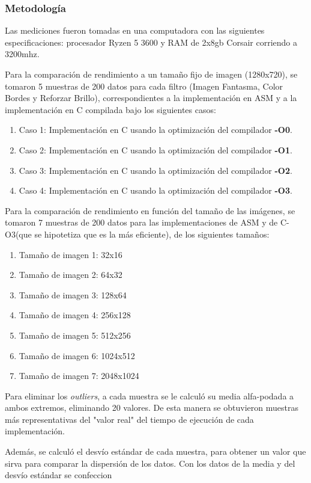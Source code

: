 \documentclass[a4paper]{article}
\begin{document}
\subsubsection{Metodología}
\justify
Las mediciones fueron tomadas en una computadora con las siguientes especificaciones: procesador Ryzen 5 3600 y RAM de 2x8gb Corsair corriendo a 3200mhz.

\justify
Para la comparación de rendimiento a un tamaño fijo de imagen (1280x720), se tomaron 5 muestras de 200 datos para cada filtro (Imagen Fantasma, Color Bordes y Reforzar Brillo), correspondientes a la implementación en ASM y a la implementación en C compilada bajo los siguientes casos:
\begin{enumerate}
	\item Caso 1: Implementación en C usando la optimización del compilador \textbf{-O0}.
	\item Caso 2: Implementación en C usando la optimización del compilador \textbf{-O1}.
	\item Caso 3: Implementación en C usando la optimización del compilador \textbf{-O2}.
	\item Caso 4: Implementación en C usando la optimización del compilador \textbf{-O3}.
\end{enumerate}

\justify
Para la comparación de rendimiento en función del tamaño de las imágenes, se tomaron 7 muestras de 200 datos para las implementaciones de ASM y de C-O3(que se hipotetiza que es la más eficiente), de los siguientes tamaños:
\begin{enumerate}
	\item  Tamaño de imagen 1: 32x16
	\item  Tamaño de imagen 2: 64x32
	\item  Tamaño de imagen 3: 128x64
	\item  Tamaño de imagen 4: 256x128  
	\item  Tamaño de imagen 5: 512x256
	\item  Tamaño de imagen 6: 1024x512
	\item  Tamaño de imagen 7: 2048x1024
\end{enumerate}

\justify	
Para eliminar los \textit{outliers}, a cada muestra se le calculó su media alfa-podada a ambos extremos, eliminando 20 valores. De esta manera se obtuvieron muestras más representativas del "valor real" del tiempo de ejecución de cada implementación.

\justify 
Además, se calculó el desvío estándar de cada muestra, para obtener un valor que sirva para comparar la dispersión de los datos. Con los datos de la media y del desvío estándar se confeccion
\end{document}
